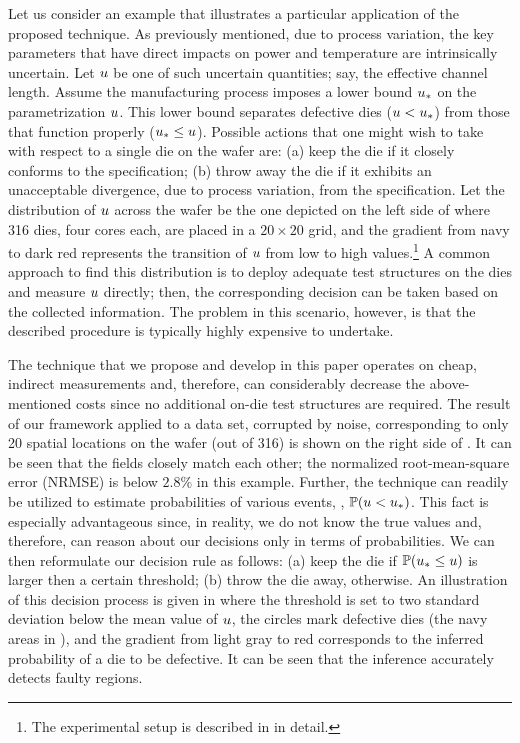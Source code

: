 
Let us consider an example that illustrates a particular application of the proposed technique. As previously mentioned, due to process variation, the key parameters that have direct impacts on power and temperature are intrinsically uncertain. Let $u$ be one of such uncertain quantities; say, the effective channel length. Assume the manufacturing process imposes a lower bound $u_*$ on the parametrization $u$. This lower bound separates defective dies ($u < u_*$) from those that function properly ($u_* \leq u$). Possible actions that one might wish to take with respect to a single die on the wafer are: (a) keep the die if it closely conforms to the specification; (b) throw away the die if it exhibits an unacceptable divergence, due to process variation, from the specification. Let the distribution of $u$ across the wafer be the one depicted on the left side of  where 316 dies, four cores each, are placed in a $20 \times 20$ grid, and the gradient from navy to dark red represents the transition of $u$ from low to high values.\footnote{The experimental setup is described in  in detail.} A common approach to find this distribution is to deploy adequate test structures on the dies and measure $u$ directly; then, the corresponding decision can be taken based on the collected information. The problem in this scenario, however, is that the described procedure is typically highly expensive to undertake.

The technique that we propose and develop in this paper operates on cheap, indirect measurements and, therefore, can considerably decrease the above-mentioned costs since no additional on-die test structures are required. The result of our framework applied to a data set, corrupted by noise, corresponding to only 20 spatial locations on the wafer (out of 316) is shown on the right side of . It can be seen that the fields closely match each other; the normalized root-mean-square error (NRMSE) is below $2.8\%$ in this example. Further, the technique can readily be utilized to estimate probabilities of various events, \eg, $\mathbb{P}(u < u_*)$. This fact is especially advantageous since, in reality, we do not know the true values and, therefore, can reason about our decisions only in terms of probabilities. We can then reformulate our decision rule as follows: (a) keep the die if $\mathbb{P}(u_* \leq u)$ is larger then a certain threshold; (b) throw the die away, otherwise. An illustration of this decision process is given in  where the threshold is set to two standard deviation below the mean value of $u$, the circles mark defective dies (the navy areas in ), and the gradient from light gray to red corresponds to the inferred probability of a die to be defective. It can be seen that the inference accurately detects faulty regions.


